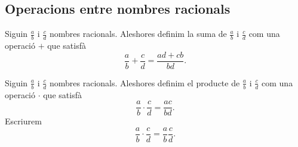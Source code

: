 \documentclass[../../Main.tex]{subfiles}
\begin{document}
	\subsection{Operacions entre nombres racionals}
	\begin{definition}
		\label{def:suma de nombres racionals}
		Siguin \(\frac{a}{b}\) i \(\frac{c}{d}\) nombres racionals. Aleshores definim la suma de \(\frac{a}{b}\) i \(\frac{c}{d}\) com una operació \(+\) que satisfà
		\[\frac{a}{b}+\frac{c}{d}=\frac{ad+cb}{bd}.\]
	\end{definition}
	\begin{definition}
		\label{def:producte de nombres racionals}
		Siguin \(\frac{a}{b}\) i \(\frac{c}{d}\) nombres racionals. Aleshores definim el producte de \(\frac{a}{b}\) i \(\frac{c}{d}\) com una operació \(\cdot\) que satisfà
		\[\frac{a}{b}\cdot\frac{c}{d}=\frac{ac}{bd}.\]
		Escriurem
		\[\frac{a}{b}\cdot\frac{c}{d}=\frac{a}{b}\frac{c}{d}.\]
	\end{definition}
\end{document}
